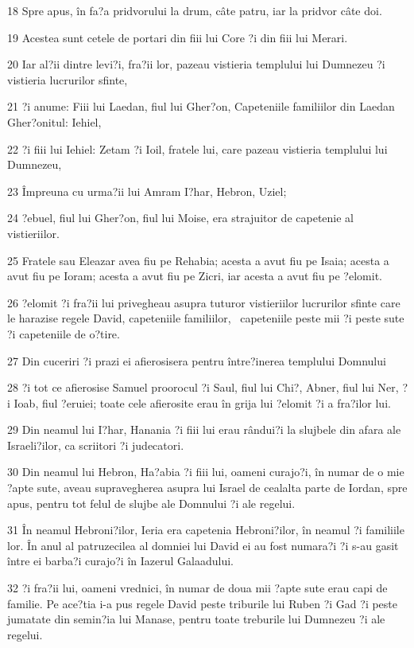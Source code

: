 \par 18 Spre apus, în fa?a pridvorului la drum, câte patru, iar la pridvor câte doi.
\par 19 Acestea sunt cetele de portari din fiii lui Core ?i din fiii lui Merari.
\par 20 Iar al?ii dintre levi?i, fra?ii lor, pazeau vistieria templului lui Dumnezeu ?i vistieria lucrurilor sfinte,
\par 21 ?i anume: Fiii lui Laedan, fiul lui Gher?on, Capeteniile familiilor din Laedan Gher?onitul: Iehiel,
\par 22 ?i fiii lui Iehiel: Zetam ?i Ioil, fratele lui, care pazeau vistieria templului lui Dumnezeu,
\par 23 Împreuna cu urma?ii lui Amram I?har, Hebron, Uziel;
\par 24 ?ebuel, fiul lui Gher?on, fiul lui Moise, era strajuitor de capetenie al vistieriilor.
\par 25 Fratele sau Eleazar avea fiu pe Rehabia; acesta a avut fiu pe Isaia; acesta a avut fiu pe Ioram; acesta a avut fiu pe Zicri, iar acesta a avut fiu pe ?elomit.
\par 26 ?elomit ?i fra?ii lui privegheau asupra tuturor vistieriilor lucrurilor sfinte care le harazise regele David, capeteniile familiilor,  capeteniile peste mii ?i peste sute ?i capeteniile de o?tire.
\par 27 Din cuceriri ?i prazi ei afierosisera pentru între?inerea templului Domnului
\par 28 ?i tot ce afierosise Samuel proorocul ?i Saul, fiul lui Chi?, Abner, fiul lui Ner, ?i Ioab, fiul ?eruiei; toate cele afierosite erau în grija lui ?elomit ?i a fra?ilor lui.
\par 29 Din neamul lui I?har, Hanania ?i fiii lui erau rândui?i la slujbele din afara ale Israeli?ilor, ca scriitori ?i judecatori.
\par 30 Din neamul lui Hebron, Ha?abia ?i fiii lui, oameni curajo?i, în numar de o mie ?apte sute, aveau supravegherea asupra lui Israel de cealalta parte de Iordan, spre apus, pentru tot felul de slujbe ale Domnului ?i ale regelui.
\par 31 În neamul Hebroni?ilor, Ieria era capetenia Hebroni?ilor, în neamul ?i familiile lor. În anul al patruzecilea al domniei lui David ei au fost numara?i ?i s-au gasit între ei barba?i curajo?i în Iazerul Galaadului.
\par 32 ?i fra?ii lui, oameni vrednici, în numar de doua mii ?apte sute erau capi de familie. Pe ace?tia i-a pus regele David peste triburile lui Ruben ?i Gad ?i peste jumatate din semin?ia lui Manase, pentru toate treburile lui Dumnezeu ?i ale regelui.

